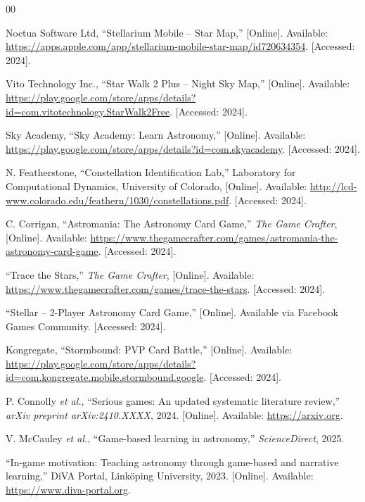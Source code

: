 \documentclass[conference]{IEEEtran}
\begin{document}
\begin{thebibliography}{00}

Noctua Software Ltd, ``Stellarium Mobile -- Star Map,'' [Online]. Available: \url{https://apps.apple.com/app/stellarium-mobile-star-map/id720634354}. [Accessed: 2024].

Vito Technology Inc., ``Star Walk 2 Plus -- Night Sky Map,'' [Online]. Available: \url{https://play.google.com/store/apps/details?id=com.vitotechnology.StarWalk2Free}. [Accessed: 2024].

Sky Academy, ``Sky Academy: Learn Astronomy,'' [Online]. Available: \url{https://play.google.com/store/apps/details?id=com.skyacademy}. [Accessed: 2024].

N. Featherstone, ``Constellation Identification Lab,'' Laboratory for Computational Dynamics, University of Colorado, [Online]. Available: \url{http://lcd-www.colorado.edu/feathern/1030/constellations.pdf}. [Accessed: 2024].

C. Corrigan, ``Astromania: The Astronomy Card Game,'' \textit{The Game Crafter}, [Online]. Available: \url{https://www.thegamecrafter.com/games/astromania-the-astronomy-card-game}. [Accessed: 2024].

``Trace the Stars,'' \textit{The Game Crafter}, [Online]. Available: \url{https://www.thegamecrafter.com/games/trace-the-stars}. [Accessed: 2024].

``Stellar -- 2-Player Astronomy Card Game,'' [Online]. Available via Facebook Games Community. [Accessed: 2024].

Kongregate, ``Stormbound: PVP Card Battle,'' [Online]. Available: \url{https://play.google.com/store/apps/details?id=com.kongregate.mobile.stormbound.google}. [Accessed: 2024].

P. Connolly \textit{et al.}, ``Serious games: An updated systematic literature review,'' \textit{arXiv preprint arXiv:2410.XXXX}, 2024. [Online]. Available: \url{https://arxiv.org}.

V. McCauley \textit{et al.}, ``Game-based learning in astronomy,'' \textit{ScienceDirect}, 2025.

``In-game motivation: Teaching astronomy through game-based and narrative learning,'' DiVA Portal, Link\"{o}ping University, 2023. [Online]. Available: \url{https://www.diva-portal.org}.


\end{thebibliography}
\end{document}
